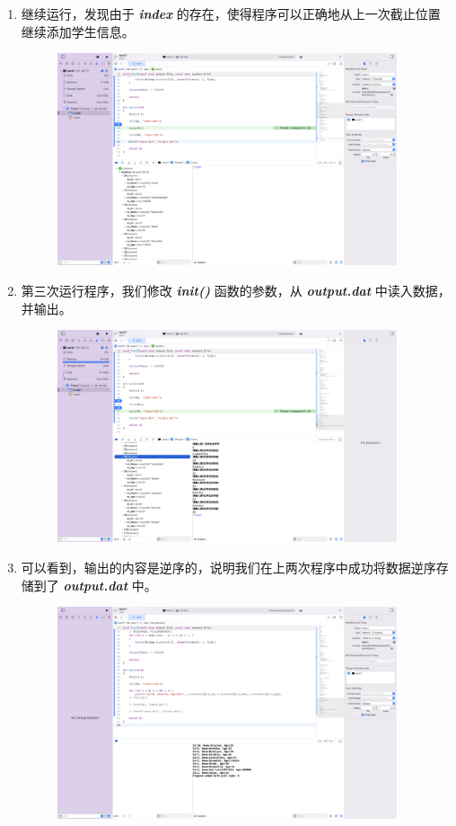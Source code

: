 \begin{enumerate}
\begin{figure}[htbp]
                \end{figure}
                \item 继续运行，发现由于 \textbf{\textit{index}} 的存在，使得程序可以正确地从上一次截止位置继续添加学生信息。
                \begin{figure}[htbp]
                    \centering
                    \includegraphics*[width = 10cm]{work1_s10.png}
                \end{figure}
                \newpage
                \item 第三次运行程序，我们修改 \textbf{\textit{init()}} 函数的参数，从 \textbf{\textit{output.dat}} 中读入数据，并输出。
                \begin{figure}[htbp]
                    \centering
                    \includegraphics*[width = 10cm]{work1_s11.png}
                \end{figure}
                \item 可以看到，输出的内容是逆序的，说明我们在上两次程序中成功将数据逆序存储到了 \textbf{\textit{output.dat}} 中。
                \begin{figure}[htbp]
                    \centering
                    \includegraphics*[width = 10cm]{work1_s12.png}
                \end{figure}
            \end{enumerate}
